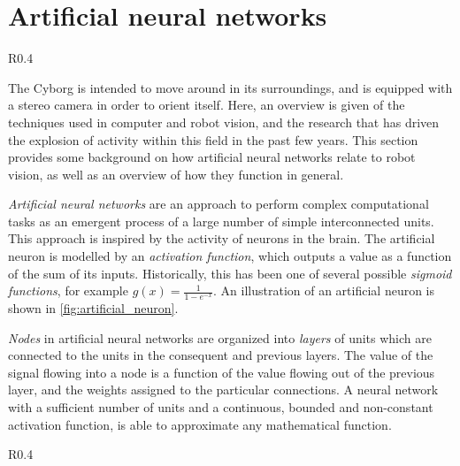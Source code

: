 \documentclass[\rootfolder/main.tex]{subfiles}
\begin{document}

\section{Artificial neural networks}

\begin{wrapfigure}{R}{0.4\columnwidth}
    \caption{Model of an artificial neuron.\label{fig:artificial_neuron}}
\end{wrapfigure}

The Cyborg is intended to move around in its surroundings, and is equipped with a stereo camera in order to orient itself.
Here, an overview is given of the techniques used in computer and robot vision, and the research that has driven the explosion of activity within this field in the past few years.
This section provides some background on how artificial neural networks relate to robot vision, as well as an overview of how they function in general.

\emph{Artificial neural networks} are an approach to perform complex computational tasks as an emergent process of a large number of simple interconnected units.
This approach is inspired by the activity of neurons in the brain.
The artificial neuron is modelled by an \emph{activation function}, which outputs a value as a function of the sum of its inputs.
Historically, this has been one of several possible \emph{sigmoid functions}, for example $g\left(x\right) = \frac{1}{1 - e^{-x}}$.
An illustration of an artificial neuron is shown in \cref{fig:artificial_neuron}.

\emph{Nodes} in artificial neural networks are organized into \emph{layers} of units which are connected to the units in the consequent and previous layers.
The value of the signal flowing into a node is a function of the value flowing out of the previous layer, and the weights assigned to the particular connections.
A neural network with a sufficient number of units and a continuous, bounded and non-constant activation function, is able to approximate any mathematical function\cite{Cybenko1989}\cite{Hornik1991}.

\begin{wrapfigure}{R}{0.4\columnwidth}
    \caption{\acrshort{xor} network, illustrating how neurons can implement basic logic functions.\label{fig:xor_net}}
\end{wrapfigure}
\end{document}
